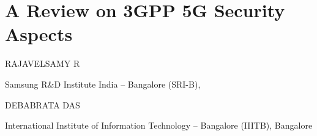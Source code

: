 \chapter{A Review on 3GPP 5G Security Aspects}

\begin{center}
{\large\uppercase{Rajavelsamy R}} 

\vskip -6pt

Samsung R\&D Institute India – Bangalore (SRI-B),

\bigskip
{\large\uppercase{Debabrata Das}} 

\vskip -6pt

International Institute of Information Technology – Bangalore (IIITB), Bangalore
\end{center}

\noindent{}

\newpage

